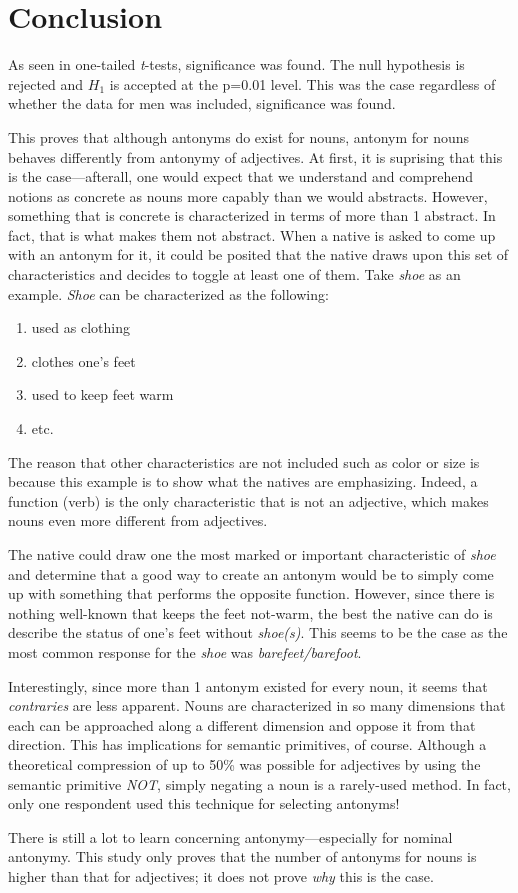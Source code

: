 \section {Conclusion}
\label{conclusion}

As seen in one-tailed \textit{t}-tests, significance was found.  The null hypothesis is rejected and $H_{1}$ is accepted at the p=0.01 level.  This was the case regardless of whether the data for men was included, significance was found.  

This proves that although antonyms do exist for nouns, antonym for nouns behaves differently from antonymy of adjectives.  At first, it is suprising that this is the case---afterall, one would expect that we understand and comprehend notions as concrete as nouns more capably than we would abstracts.  However, something that is concrete is characterized in terms of more than 1 abstract.  In fact, that is what makes them not abstract.  When a native is asked to come up with an antonym for it, it could be posited that the native draws upon this set of characteristics and decides to toggle at least one of them.  Take \textit{shoe} as an example.  \textit{Shoe} can be characterized as the following:

\begin{enumerate}
	\item used as clothing
	\item clothes one's feet
	\item used to keep feet warm
	\item etc.
\end{enumerate}

The reason that other characteristics are not included such as color or size is because this example is to show what the natives are emphasizing.  Indeed, a function (verb) is the only characteristic that is not an adjective, which makes nouns even more different from adjectives.

The native could draw one the most marked or important characteristic of \textit{shoe} and determine that a good way to create an antonym would be to simply come up with something that performs the opposite function.  However, since there is nothing well-known that keeps the feet not-warm, the best the native can do is describe the status of one's feet without \textit{shoe(s)}.  This seems to be the case as the most common response for the \textit{shoe} was \textit{barefeet/barefoot}.  

Interestingly, since more than 1 antonym existed for every noun, it seems that \textit{contraries} are less apparent.  Nouns are characterized in so many dimensions that each can be approached along a different dimension and oppose it from that direction.  This has implications for semantic primitives, of course.  Although a theoretical compression of up to 50\% was possible for adjectives by using the semantic primitive \textit{NOT}, simply negating a noun is a rarely-used method.  In fact, only one respondent used this technique for selecting antonyms!

There is still a lot to learn concerning antonymy---especially for nominal antonymy.  This study only proves that the number of antonyms for nouns is higher than that for adjectives; it does not prove \textit{why} this is the case.  
